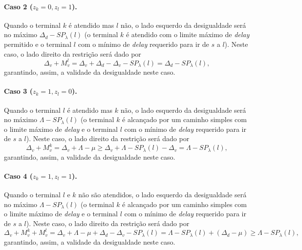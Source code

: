 \noindent\paragraph*{{\bf  Caso   2}  ($z_k=0,  z_l=1$).}    Quando  o
terminal $k$ é  atendido mas $l$ não, o lado  esquerdo da desigualdade
será no máximo $\Delta_d-SP_\lambda(l)$ (o terminal $k$ é atendido com
o limite máximo de {\em delay} permitido e o terminal $l$ com o mínimo
de {\em  delay} requerido para  ir de $s$ a  $l$). Neste caso,  o lado
direito da restrição será dado por
$$\Delta_v+M_v^l=\Delta_v+\Delta_d - \Delta_v - SP_\lambda(l)=\Delta_d-SP_\lambda(l),$$
\noindent
garantindo, assim, a validade da desigualdade neste caso.

\noindent\paragraph*{{\bf  Caso   3}  ($z_k=1,  z_l=0$).}    Quando  o
terminal $l$ é  atendido mas $k$ não, o lado  esquerdo da desigualdade
será no máximo $\Lambda-SP_\lambda(l)$ (o terminal $k$ é alcançado por
um caminho simples com o limite máximo de {\em delay} e o terminal $l$
com o  mínimo de {\em  delay} requerido para ir  de $s$ a  $l$). Neste
caso, o lado direito da restrição será dado por
$$\Delta_v+M_v^k=\Delta_v+\Lambda-\mu \geq \Delta_v+\Lambda-SP_\lambda(l)-\Delta_v=\Lambda-SP_\lambda(l),$$
\noindent
garantindo, assim, a validade da desigualdade neste caso.

\noindent\paragraph*{{\bf  Caso   4}  ($z_k=1,  z_l=1$).}    Quando  o
terminal $l$ e $k$ não são  atendidos, o lado esquerdo da desigualdade
será no máximo $\Lambda-SP_\lambda(l)$ (o terminal $k$ é alcançado por
um caminho simples com o limite máximo de {\em delay} e o terminal $l$
com o  mínimo de {\em  delay} requerido para ir  de $s$ a  $l$). Neste
caso, o lado direito da restrição será dado por
$$\Delta_v+M_v^k+M_v^l=
  \Delta_v+\Lambda-\mu+\Delta_d - \Delta_v - SP_\lambda(l)=
  \Lambda-SP_\lambda(l)+(\Delta_d-\mu) \geq \Lambda-SP_\lambda(l),$$
\noindent
garantindo, assim, a validade da desigualdade neste caso.

